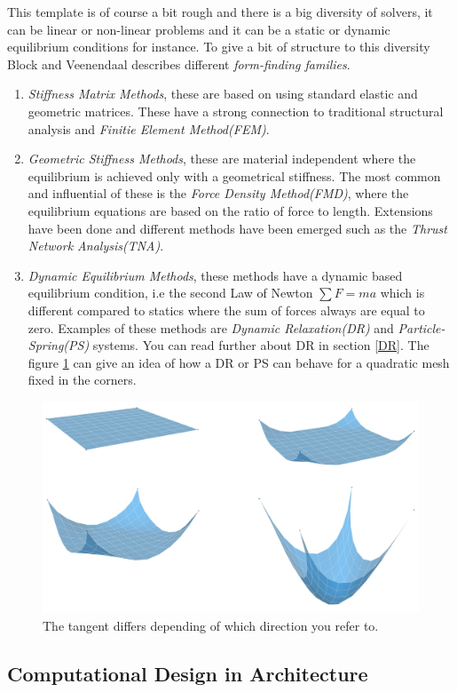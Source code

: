 This template is of course a bit rough and there is a big diversity of solvers, it can be linear or non-linear problems and it can be a static or dynamic equilibrium conditions for instance. To give a bit of structure to this diversity Block and Veenendaal describes different \textit{form-finding families}.\\ 


\begin{enumerate}
\item \textit{Stiffness Matrix Methods}, these are based on using standard elastic and geometric matrices. These have a strong connection to traditional structural analysis and \textit{Finitie Element Method(FEM)}.
\item \textit{Geometric Stiffness Methods}, these are material independent where the equilibrium is achieved only with a geometrical stiffness. The most common and influential of these is the \textit{Force Density Method(FMD)}, where the equilibrium equations are based on the ratio of force to length. Extensions have been done and different methods have been emerged such as the \textit{Thrust Network Analysis(TNA)}.
\item \textit{Dynamic Equilibrium Methods}, these methods have a dynamic based equilibrium condition, i.e the second Law of Newton $\sum F = ma$ which is different compared to statics where the sum of forces always are equal to zero. Examples of these methods are \textit{Dynamic Relaxation(DR)} and \textit{Particle-Spring(PS)} systems. You can read further about DR in section \ref{DR}. The figure \ref{fig:DR} can give an idea of how a DR or PS can behave for a quadratic mesh fixed in the corners. 

\end{enumerate}
\begin{figure}[H] 
\centering
\includegraphics[width=0.6\linewidth ]{figure/Theory/PartSpring.jpg}
\caption{The tangent differs depending of which direction you refer to. }
\label{fig:DR}
\end{figure}


\subsection{Computational Design in Architecture}

